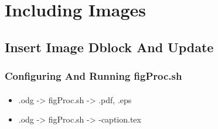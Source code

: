 \begin{comment}
*  [[elisp:(org-cycle)][| ]] [[elisp:(org-show-subtree)][|=]] [[elisp:(show-children 10)][|V]] [[elisp:(bx:orgm:indirectBufOther)][|>]] [[elisp:(bx:orgm:indirectBufMain)][|I]] [[elisp:(blee:ppmm:org-mode-toggle)][|N]] [[elisp:(org-top-overview)][|O]] [[elisp:(progn (org-shifttab) (org-content))][|C]] [[elisp:(delete-other-windows)][|1]]  /Section/   Including Images ::  [[elisp:(org-cycle)][| ]]
\end{comment}

\section{Including Images}


\begin{comment}
**  [[elisp:(org-cycle)][| ]] [[elisp:(org-show-subtree)][|=]] [[elisp:(show-children 10)][|V]] [[elisp:(bx:orgm:indirectBufOther)][|>]] [[elisp:(bx:orgm:indirectBufMain)][|I]] [[elisp:(blee:ppmm:org-mode-toggle)][|N]] [[elisp:(org-top-overview)][|O]] [[elisp:(progn (org-shifttab) (org-content))][|C]] [[elisp:(delete-other-windows)][|1]]  /Subsection/   Insert Image Dblock And Update ::  [[elisp:(org-cycle)][| ]]
\end{comment}

\subsection{Insert Image Dblock And Update}



\begin{comment}
*****  [[elisp:(org-cycle)][| ]]  [[elisp:(blee:ppmm:org-mode-toggle)][Nat]] [[elisp:(beginning-of-buffer)][Top]] [[elisp:(delete-other-windows)][(1)]] || /Frame/ *Label=ConfiguringAndRunningfigProc.sh*  Configuring And Running figProc.sh ::  [[elisp:(org-cycle)][| ]]
\end{comment}

\begin{frame}[fragile,label=ConfiguringAndRunningfigProc.sh]
    \frametitle{Configuring And Running figProc.sh}
    \framesubtitle{}


    \begin{itemize}
    \item .odg  -> figProc.sh -> .pdf, .eps
    \item .odg  -> figProc.sh -> -caption.tex      
    \end{itemize}

\end{frame}


